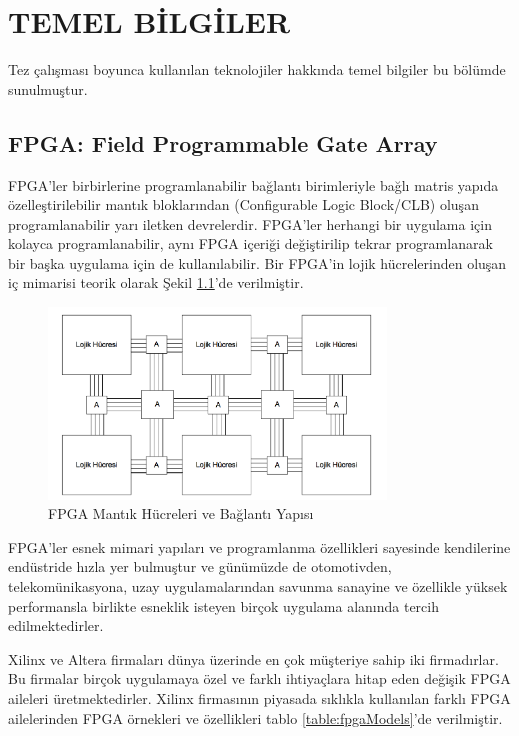 \chapter{TEMEL BİLGİLER} \label{chapter:temelBilgiler}
Tez çalışması boyunca kullanılan teknolojiler hakkında temel bilgiler bu bölümde sunulmuştur.
\section{FPGA: Field Programmable Gate Array}
FPGA'ler birbirlerine programlanabilir bağlantı birimleriyle bağlı matris yapıda özelleştirilebilir mantık bloklarından (Configurable Logic Block/CLB) oluşan programlanabilir yarı iletken devrelerdir. FPGA’ler herhangi bir uygulama için kolayca programlanabilir, aynı FPGA içeriği değiştirilip tekrar programlanarak bir başka uygulama için de kullanılabilir. Bir FPGA’in lojik hücrelerinden oluşan iç mimarisi teorik olarak Şekil \ref{image:fpgaCLB}’de verilmiştir.\par
\begin{figure}[ht]
\centering
\shorthandoff{=}
\includegraphics[width=0.8\textwidth]{gorsel/fpgaCLB.png}
\shorthandoff{=}
\caption{FPGA Mantık Hücreleri ve Bağlantı Yapısı}
\label{image:fpgaCLB}
\end{figure}

FPGA'ler esnek mimari yapıları ve programlanma özellikleri sayesinde kendilerine endüstride hızla yer bulmuştur ve günümüzde de otomotivden, telekomünikasyona, uzay uygulamalarından savunma sanayine ve özellikle yüksek performansla birlikte esneklik isteyen birçok uygulama alanında tercih edilmektedirler. \cite{aykenarThesis} \par

Xilinx ve Altera firmaları dünya üzerinde en çok müşteriye sahip iki firmadırlar. Bu firmalar birçok uygulamaya özel ve farklı ihtiyaçlara hitap eden değişik FPGA aileleri üretmektedirler. Xilinx firmasının piyasada sıklıkla kullanılan farklı FPGA ailelerinden FPGA örnekleri ve özellikleri tablo \ref{table:fpgaModels}’de verilmiştir.\par

